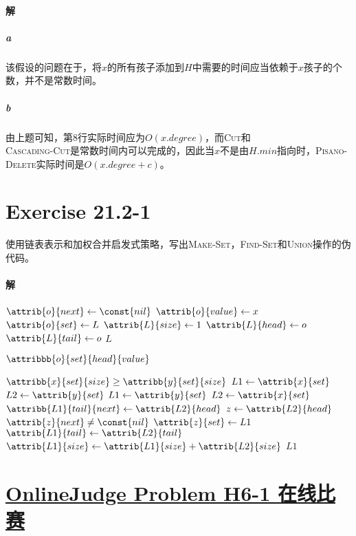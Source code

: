\documentclass{article}
\begin{document}
\paragraph{解}
\subparagraph*{a}
该假设的问题在于，将$x$的所有孩子添加到$H$中需要的时间应当依赖于$x$孩子的个数，并不是常数时间。
\subparagraph*{b}
由上题可知，第8行实际时间应为$O(x.degree)$，而\textsc{Cut}和\\
\textsc{Cascading-Cut}是常数时间内可以完成的，因此当$x$不是由$H.min$指向时，\textsc{Pisano-Delete}实际时间是$O(x.degree+c)$。

\section{Exercise 21.2-1}
使用链表表示和加权合并启发式策略，写出\textsc{Make-Set}，\textsc{Find-Set}和\textsc{Union}操作的伪代码。

\paragraph{解}
\begin{codebox}
\li $\attrib{o}{next} \gets \const{nil}$
\li $\attrib{o}{value} \gets x$
\li $\attrib{o}{set} \gets L$
\li	$\attrib{L}{size} \gets 1$
\li $\attrib{L}{head} \gets o$
\li $\attrib{L}{tail} \gets o$
\li \Return $L$
\end{codebox}

\begin{codebox}
\li	\Return $\attribbb{o}{set}{head}{value}$
\end{codebox}

\begin{codebox}
\li \If $\attribb{x}{set}{size} \geq \attribb{y}{set}{size}$ \Then
\li 	$L1 \gets \attrib{x}{set}$
\li 	$L2 \gets \attrib{y}{set}$
\li	\Else
\li 	$L1 \gets \attrib{y}{set}$
\li 	$L2 \gets \attrib{x}{set}$
	\End
\li	$\attribb{L1}{tail}{next} \gets \attrib{L2}{head}$
\li $z \gets \attrib{L2}{head}$
\li \While $\attrib{z}{next} \neq \const{nil}$
	\Do
\li		$\attrib{z}{set} \gets L1$
	\End
\li	$\attrib{L1}{tail} \gets \attrib{L2}{tail}$
\li $\attrib{L1}{size} \gets \attrib{L1}{size} + \attrib{L2}{size}$
\li \Return $L1$
\end{codebox}
\section{\href{https://202.38.86.171/problem/H6-1}{OnlineJudge Problem H6-1 在线比赛}}
\end{document}
